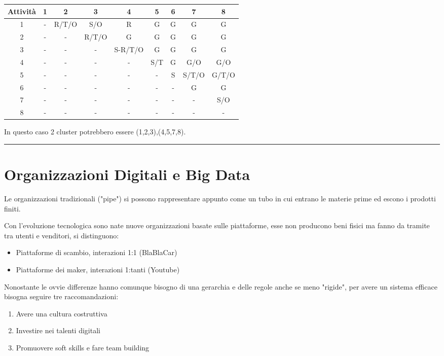 \documentclass{article}
\begin{document}
\begin{table}[ht]
    \centering
    \begin{tabular}{c|c|c|c|c|c|c|c|c}
        Attività & 1 & 2 & 3 & 4 & 5 & 6 & 7 & 8\\
         \hline
        1 & - & R/T/O & S/O & R & G & G & G & G \\
         \hline
        2 & - & - & R/T/O & G & G & G & G & G \\
         \hline
        3 & - & - & - & S-R/T/O & G & G & G & G \\
         \hline
        4 & - & - & - & - & S/T & G & G/O & G/O \\
         \hline
        5 & - & - & - & - & - & S & S/T/O & G/T/O \\
         \hline
        6 & - & - & - & - & - & - & G & G \\
         \hline
        7 & - & - & - & - & - & - & - & S/O \\
         \hline
        8 & - & - & - & - & - & - & - & - \\
    \end{tabular}
\end{table}

\noindent In questo caso 2 cluster potrebbero essere (1,2,3),(4,5,7,8).

\noindent\rule{\textwidth}{0.5pt}\newline

\section{Organizzazioni Digitali e Big Data}

Le organizzazioni tradizionali ("pipe") si possono rappresentare appunto come un tubo in cui entrano le materie prime ed escono i prodotti finiti.\newline

\noindent Con l'evoluzione tecnologica sono nate nuove organizzazioni basate sulle piattaforme, esse non producono beni fisici ma fanno da tramite tra utenti e venditori, si distinguono:
\begin{itemize}
    \item Piattaforme di scambio, interazioni 1:1 (BlaBlaCar)
    \item Piattaforme dei maker, interazioni 1:tanti (Youtube)\newline
\end{itemize}

\noindent Nonostante le ovvie differenze hanno comunque bisogno di una gerarchia e delle regole anche se meno "rigide", per avere un sistema efficace bisogna seguire tre raccomandazioni:
\begin{enumerate}
    \item Avere una cultura costruttiva
    \item Investire nei talenti digitali
    \item Promuovere soft skills e fare team building\newline
\end{enumerate}
\end{document}
